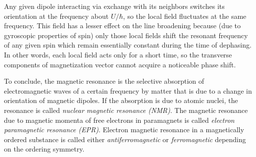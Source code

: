 Any given dipole interacting via exchange with its neighbors switches its orientation at the frequency about $U/\hbar$, so the local field fluctuates at the same frequency. This field has a lesser effect on the line broadening because (due to gyroscopic properties of spin) only those local fields shift the resonant frequency of any given spin which remain essentially constant during the time of dephasing. In other words, each local field acts only for a short time, so the transverse components of magnetization vector cannot acquire a noticeable phase shift.

To conclude, the magnetic resonance is the selective absorption of electromagnetic waves of a certain frequency by matter that is due to a change in orientation of magnetic dipoles. If the absorption is due to atomic nuclei, the resonance is called \emph{nuclear magnetic resonance (NMR)}. The magnetic resonance due to magnetic momenta of free electrons in paramagnets is called \emph{electron paramagnetic resonance (EPR)}. Electron magnetic resonance in a magnetically ordered substance is called either \emph{antiferromagnetic} or \emph{ferromagnetic} depending on the ordering symmetry. 
